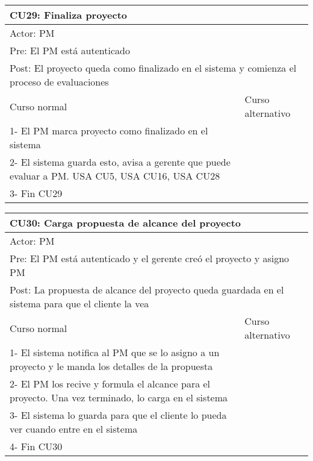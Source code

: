 \begin{table}[H]
  \begin{adjustbox}{max width = \textwidth}
  \begin{tabular}{|l|l|}
    \hline
    \multicolumn{2}{|l|}{CU29: Finaliza proyecto} \\\hline
    \multicolumn{2}{|l|}{Actor: PM} \\\hline
    \multicolumn{2}{|l|}{Pre: El PM está autenticado} \\\hline
    \multicolumn{2}{|l|}{Post: El proyecto queda como finalizado en el sistema y comienza el proceso de evaluaciones} \\\hline
     Curso normal & Curso alternativo\\ \hline
	 1- El PM marca proyecto como finalizado en el sistema & \\ \hline
	 2- El sistema guarda esto, avisa a gerente que puede evaluar a PM. USA CU5, USA CU16, USA CU28 & \\ \hline
   3- Fin CU29 & \\ \hline
  \end{tabular}
  \end{adjustbox}
\end{table}

\begin{table}[H]
  \begin{adjustbox}{max width = \textwidth}
  \begin{tabular}{|l|l|}
    \hline
    \multicolumn{2}{|l|}{CU30: Carga propuesta de alcance del proyecto} \\\hline
    \multicolumn{2}{|l|}{Actor: PM} \\\hline
    \multicolumn{2}{|l|}{Pre: El PM está autenticado y el gerente creó el proyecto y asigno PM} \\\hline
    \multicolumn{2}{|l|}{Post: La propuesta de alcance del proyecto queda guardada en el sistema para que el cliente la vea} \\\hline
     Curso normal & Curso alternativo\\ \hline
	 1- El sistema notifica al PM que se lo asigno a un proyecto y le manda los detalles de la propuesta & \\ \hline
	 2- El PM los recive y formula el alcance para el proyecto. Una vez terminado, lo carga en el sistema& \\ \hline
   3- El sistema lo guarda para que el cliente lo pueda ver cuando entre en el sistema & \\ \hline
   4- Fin CU30 & \\ \hline
  \end{tabular}
  \end{adjustbox}
\end{table}


